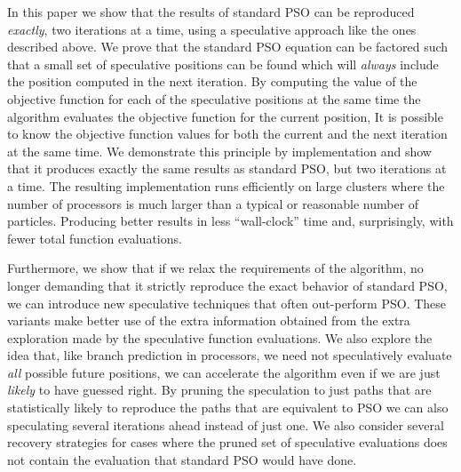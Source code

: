\documentclass[journal,letterpaper]{IEEEtran}
\begin{document}
% 
% 

In this paper we show that the results of standard PSO can be reproduced \emph{exactly}, two iterations at a time, using
a speculative approach like the ones described above. We prove that the standard PSO equation can
be factored such that a small set of speculative positions can be found which will \emph{always}
include the position computed in the next iteration.
By computing the value of the objective function for each of the speculative positions at
the same time the algorithm evaluates the objective function for the current position,
It is possible to know the objective function values for both the current and the next iteration at the same time.
We demonstrate this principle by implementation and show that it
produces exactly the same results as standard PSO, but two iterations at a time.
The resulting implementation runs efficiently on large clusters where the number of processors is much larger than
a typical or reasonable number of particles. Producing better results in less ``wall-clock'' time and,
surprisingly, with fewer total function evaluations.

Furthermore, we show that if we relax the requirements of the algorithm, no
longer demanding that it strictly reproduce the exact behavior of standard PSO, we
can introduce new speculative techniques that often out-perform PSO.
These variants make better use of the extra information obtained from
the extra exploration made by the speculative function evaluations.
We also explore the idea that, like branch prediction in processors, we
need not speculatively evaluate \emph{all} possible future positions,
we can accelerate the algorithm even if we are just \emph{likely} to have guessed right.
By pruning the speculation to just paths that are statistically likely to reproduce
the paths that are equivalent to PSO we can also 
speculating several iterations ahead instead of just one.
We also consider several recovery strategies for cases where
the pruned set of speculative evaluations does not contain the evaluation that standard PSO would have done.
\end{document}

